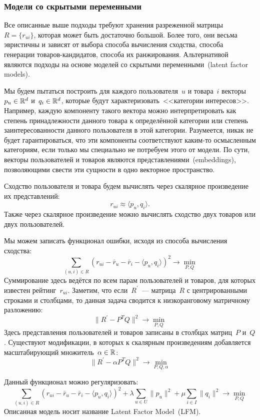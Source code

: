 \documentclass[12pt,fleqn]{article}
\begin{document}
	\subsubsection{Модели со скрытыми переменными}
	Все описанные выше подходы требуют хранения разреженной матрицы~$R = \{r_{ui}\}$,
	которая может быть достаточно большой.
	Более того, они весьма эвристичны и зависят от выбора способа вычисления сходства,
	способа генерации товаров-кандидатов, способа их ранжирования.
	Альтернативой являются подходы на основе моделей со скрытыми переменными~(latent factor models).
	
	Мы будем пытаться построить для каждого пользователя~$u$ и товара~$i$ векторы~$p_u \in \mathbb{R}^d$
	и~$q_i \in \mathbb{R}^d$, которые будут характеризовать~<<категории интересов>>.
	Например, каждую компоненту такого вектора можно интерпретировать как степень принадлежности
	данного товара к определённой категории или степень заинтересованности данного пользователя
	в этой категории.
	Разумеется, никак не будет гарантироваться, что эти компоненты соответствуют каким-то осмысленным категориям,
	если только мы специально не потребуем этого от модели.
	По сути, векторы пользователей и товаров являются представлениями~(embeddings),
	позволяющими свести эти сущности в одно векторное пространство.
	
	Сходство пользователя и товара будем вычислять через скалярное произведение их представлений:
	\[
	r_{ui}
	\approx
	\langle p_u, q_i \rangle.
	\]
	Также через скалярное произведение можно вычислять сходство двух товаров или двух пользователей.
	
	Мы можем записать функционал ошибки, исходя из способа вычисления сходства:
	\begin{equation}
	\label{eq:lfm}
	\sum_{(u, i) \in R}
	\left(
	r_{ui}
	- \bar r_u
	- \bar r_i
	- \langle p_u, q_i \rangle
	\right)^2
	\to
	\min_{P, Q}
	\end{equation}
	Суммирование здесь ведётся по всем парам пользователей и товаров, для которых известен рейтинг~$r_{ui}$.
	Заметим, что если~$R^\prime$~--- матрица~$R$ с центрированными строками и столбцами,
	то данная задача сводится к низкоранговому матричному разложению:
	\[
	\|R^\prime - P^T Q\|^2 \to \min_{P, Q}
	\]
	Здесь представления пользователей и товаров записаны в столбцах матриц~$P$ и~$Q$.
	Существуют модификации, в которых к скалярным произведениям добавляется масштабирующий множитель~$\alpha \in \mathbb{R}$:
	\[
	\|R^\prime - \alpha P^T Q\|^2 \to \min_{P, Q, \alpha}
	\]
	
	Данный функционал можно регуляризовать:
	\begin{equation}
	\label{eq:lfmReg}
	\sum_{(u, i) \in R}
	\left(
	r_{ui}
	- \bar r_u
	- \bar r_i
	- \langle p_u, q_i \rangle
	\right)^2
	+
	\lambda
	\sum_{u \in U}
	\|p_u\|^2
	+
	\mu
	\sum_{i \in I}
	\|q_i\|^2
	\to
	\min_{P, Q}
	\end{equation}
	Описанная модель носит название Latent Factor Model~(LFM).
	
\end{document}
